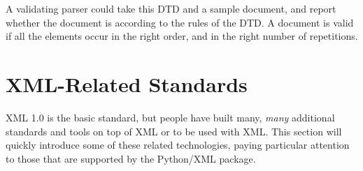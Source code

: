 \documentclass{howto}
\begin{document}
A validating parser could take this DTD and a sample document, and
report whether the document is  according to the rules of
the DTD.  A document is valid if all the elements occur in the right
order, and in the right number of repetitions.


\section{XML-Related Standards\label{section-standards}}

XML 1.0 is the basic standard, but people have built many, \emph{many}
additional standards and tools on top of XML or to be used with XML.
This section will quickly introduce some of these related
technologies, paying particular attention to those that are supported
by the Python/XML package.
\end{document}
